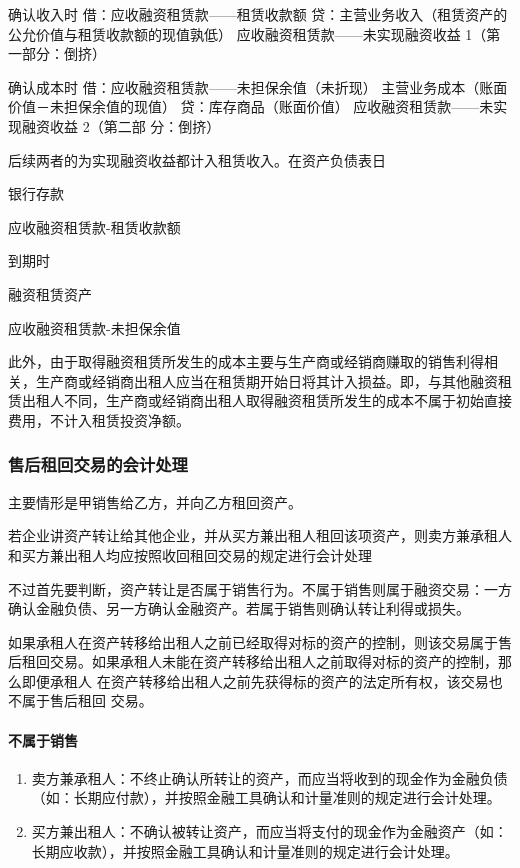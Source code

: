 \documentclass[UTF8,12pt]{ctexart}
\newenvironment{Dr}{%
	\begin{list}{}%
		{
			\setlength{\leftmargin}{2em}
			\setlength{\labelwidth}{2em}
			\setlength{\labelsep}{0pt}
			\setlength{\itemindent}{0pt}
			\setlength{\listparindent}{0pt}
			\setlength{\parsep}{0pt}
			\setlength{\topsep}{0pt}
		}
		\item[\textbf{借：}]
	}{%
	\end{list}
}
\newenvironment{Cr}{%
	\begin{list}{}%
		{
			\setlength{\leftmargin}{2em}
			\setlength{\labelwidth}{2em}
			\setlength{\labelsep}{0pt}
			\setlength{\itemindent}{0pt}
			\setlength{\listparindent}{0pt}
			\setlength{\parsep}{0pt}
			\setlength{\topsep}{0pt}
		}
		\item[\textbf{贷：}]
	}{%
	\end{list}
}
\numberwithin{equation}{section} %
\numberwithin{figure}{section}
\numberwithin{table}{section}
\begin{document}
	确认收入时
	借：应收融资租赁款——租赁收款额
	贷：主营业务收入（租赁资产的公允价值与租赁收款额的现值孰低）
	应收融资租赁款——未实现融资收益
	1（第一部分：倒挤）
	
	确认成本时
	借：应收融资租赁款——未担保余值（未折现）
	主营业务成本（账面价值－未担保余值的现值） 贷：库存商品（账面价值）
	应收融资租赁款——未实现融资收益 2（第二部
	分：倒挤）
	
	后续两者的为实现融资收益都计入租赁收入。在资产负债表日
	\begin{Dr}
		银行存款
	\end{Dr}
	\begin{Cr}
		应收融资租赁款-租赁收款额
	\end{Cr}

	到期时
	\begin{Dr}
		融资租赁资产
	\end{Dr}
	\begin{Cr}
		应收融资租赁款-未担保余值
	\end{Cr}
	
	此外，由于取得融资租赁所发生的成本主要与生产商或经销商赚取的销售利得相关，生产商或经销商出租人应当在租赁期开始日将其计入损益。即，与其他融资租赁出租人不同，生产商或经销商出租人取得融资租赁所发生的成本不属于初始直接费用，不计入租赁投资净额。
	
	\subsubsection{售后租回交易的会计处理}
	主要情形是甲销售给乙方，并向乙方租回资产。
	
	若企业讲资产转让给其他企业，并从买方兼出租人租回该项资产，则卖方兼承租人和买方兼出租人均应按照收回租回交易的规定进行会计处理
	
	不过首先要判断，资产转让是否属于销售行为。不属于销售则属于融资交易：一方确认金融负债、另一方确认金融资产。若属于销售则确认转让利得或损失。
	
	如果承租人在资产转移给出租人之前已经取得对标的资产的控制，则该交易属于售后租回交易。如果承租人未能在资产转移给出租人之前取得对标的资产的控制，那么即便承租人
	在资产转移给出租人之前先获得标的资产的法定所有权，该交易也不属于售后租回  交易。
	
	\paragraph{不属于销售}
	\begin{enumerate}
		\item 卖方兼承租人：不终止确认所转让的资产，而应当将收到的现金作为金融负债（如：长期应付款），并按照金融工具确认和计量准则的规定进行会计处理。
	
		\item 买方兼出租人：不确认被转让资产，而应当将支付的现金作为金融资产（如：长期应收款），并按照金融工具确认和计量准则的规定进行会计处理。
	\end{enumerate}
	
\end{document}
